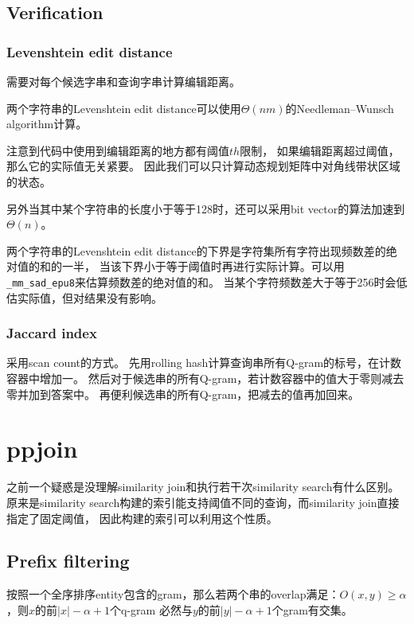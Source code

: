 \subsection{Verification}

\subsubsection{Levenshtein edit distance}

需要对每个候选字串和查询字串计算编辑距离。

两个字符串的Levenshtein edit distance可以使用$\Theta(nm)$的Needleman–Wunsch algorithm计算。

注意到代码中使用到编辑距离的地方都有阈值$\mathit{th}$限制，
如果编辑距离超过阈值，那么它的实际值无关紧要。
因此我们可以只计算动态规划矩阵中对角线带状区域的状态。

另外当其中某个字符串的长度小于等于128时，还可以采用bit vector的算法\cite{edit03}加速到$\Theta(n) $。

两个字符串的Levenshtein edit distance的下界是字符集所有字符出现频数差的绝对值的和的一半，
当该下界小于等于阈值时再进行实际计算。可以用\texttt{\_mm\_sad\_epu8}来估算频数差的绝对值的和。
当某个字符频数差大于等于256时会低估实际值，但对结果没有影响。

\subsubsection{Jaccard index}

采用scan count的方式。
先用rolling hash计算查询串所有Q-gram的标号，在计数容器中增加一。
然后对于候选串的所有Q-gram，若计数容器中的值大于零则减去零并加到答案中。
再便利候选串的所有Q-gram，把减去的值再加回来。

\section{ppjoin\cite{ppjoin}}

之前一个疑惑是没理解similarity join和执行若干次similarity search有什么区别。
原来是similarity search构建的索引能支持阈值不同的查询，而similarity join直接指定了固定阈值，
因此构建的索引可以利用这个性质。

\subsection{Prefix filtering}

按照一个全序排序entity包含的gram，那么若两个串的overlap满足：$O(x,y)\geq \alpha$，则$x$的前$|x|-\alpha+1$个q-gram
必然与$y$的前$|y|-\alpha+1$个gram有交集。

